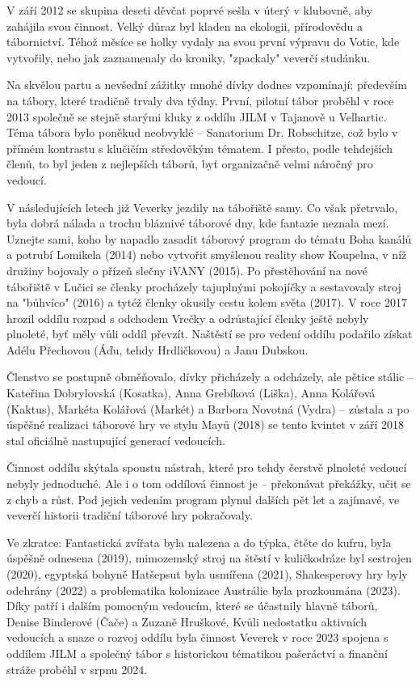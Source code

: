 V září 2012 se skupina deseti děvčat poprvé sešla v úterý v klubovně,
aby zahájila svou činnost. Velký důraz byl kladen na ekologii,
přírodovědu a tábornictví. Téhož měsíce se holky vydaly na svou první
výpravu do Votic, kde vytvořily, nebo jak zaznamenaly do kroniky,
"zpackaly" veverčí studánku.

Na skvělou partu a nevšední zážitky mnohé dívky dodnes vzpomínají;
především na tábory, které tradičně trvaly dva týdny. První, pilotní
tábor proběhl v roce 2013 společně se stejně starými kluky z oddílu JILM
v Tajanově u Velhartic. Téma tábora bylo poněkud neobvyklé -- Sanatorium
Dr. Robschitze, což bylo v přímém kontrastu s klučičím středověkým
tématem. I přesto, podle tehdejších členů, to byl jeden z nejlepších
táborů, byť organizačně velmi náročný pro vedoucí.

V následujících letech již Veverky jezdily na tábořiště samy. Co však
přetrvalo, byla dobrá nálada a trochu bláznivé táborové dny, kde
fantazie neznala mezí. Uznejte sami, koho by napadlo zasadit táborový
program do tématu Boha kanálů a potrubí Lomikela (2014) nebo vytvořit
smyšlenou reality show Koupelna, v níž družiny bojovaly o přízeň slečny
iVANY (2015). Po přestěhování na nové tábořiště v Lučici se členky
procházely tajuplnými pokojíčky a sestavovaly stroj na "bůhvíco" (2016)
a tytéž členky okusily cestu kolem světa (2017). V roce 2017 hrozil
oddílu rozpad s odchodem Vrečky a odrůstající členky ještě nebyly
plnoleté, byť měly vůli oddíl převzít. Naštěstí se pro vedení oddílu
podařilo získat Adélu Přechovou (Áďu, tehdy Hrdličkovou) a Janu Dubskou.

Členstvo se postupně obměňovalo, dívky přicházely a odcházely, ale
pětice stálic -- Kateřina Dobrylovská (Kosatka), Anna Grebíková (Liška),
Anna Kolářová (Kaktus), Markéta Kolářová (Markét) a Barbora Novotná
(Vydra) -- zůstala a po úspěšné realizaci táborové hry ve stylu Mayů
(2018) se tento kvintet v září 2018 stal oficiálně nastupující generací
vedoucích.

Činnost oddílu skýtala spoustu nástrah, které pro tehdy čerstvě plnoleté
vedoucí nebyly jednoduché. Ale i o tom oddílová činnost je -- překonávat
překážky, učit se z chyb a růst. Pod jejich vedením program plynul
dalších pět let a zajímavé, ve veverčí historii tradiční táborové hry
pokračovaly.

Ve zkratce: Fantastická zvířata byla nalezena a do týpka, čtěte do
kufru, byla úspěšně odnesena (2019), mimozemský stroj na štěstí v
kuličkodráze byl sestrojen (2020), egyptská bohyně Hatšepsut byla
usmířena (2021), Shakesperovy hry byly odehrány (2022) a problematika
kolonizace Austrálie byla prozkoumána (2023). Díky patří i dalším
pomocným vedoucím, které se účastnily hlavně táborů, Denise Binderové
(Čače) a Zuzaně Hruškové. Kvůli nedostatku aktivních vedoucích a snaze o
rozvoj oddílu byla činnost Veverek v roce 2023 spojena s oddílem JILM a
společný tábor s historickou tématikou pašeráctví a finanční stráže
proběhl v srpnu 2024.

